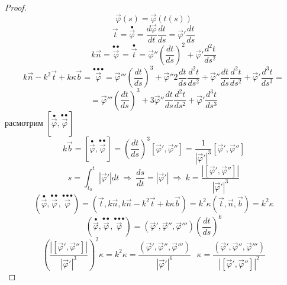 \begin{proof}
  $$
  \vec \varphi(s) = \vec \varphi(t(s))
  $$
  $$
  \vec t = \stackrel{\bullet}{\vec \varphi} = \frac{d \vec \varphi}{dt}
  \frac{dt}{ds} = \vec \varphi' \frac{dt}{ds}
  $$
  $$
  k \vec n = \stackrel{\bullet \bullet}{\vec \varphi} =
  \stackrel{\bullet}{\vec t} = \vec \varphi'' \left(\frac{dt}{ds}\right)^2 +
  \vec \varphi' \frac{d^2t}{ds^2}
  $$
  $$
  k \vec n - k^2 \vec t + k \kappa \vec b =
  \stackrel{\bullet \bullet \bullet}{\vec \varphi} = \vec \varphi'''
  \left(\frac{dt}{ds}\right)^3 + \vec \varphi'' 2 \frac{dt}{ds}
  \frac{d^2 t}{ds^2} +
  \vec \varphi'' \frac{dt}{ds} \frac{d^2 t}{ds^2} + \vec \varphi'
  \frac{d^3 t}{ds^3} =
  $$
  $$
  = \vec \varphi''' \left(\frac{dt}{ds}\right)^3 + 3 \vec \varphi''
  \frac{dt}{ds}\frac{d^2t}{ds^2} + \vec \varphi' \frac{d^3t}{ds^3}
  $$
  расмотрим $[\stackrel{\bullet}{\vec \varphi},
  \stackrel{\bullet \bullet}{\vec \varphi}]$
  $$
  k \vec b = [\stackrel{\bullet}{\vec \varphi},
  \stackrel{\bullet \bullet}{\vec \varphi}] = \left(\frac{dt}{ds}\right)^3
  [\vec \varphi', \vec \varphi''] = \frac{1}{|\vec \varphi'|^3}
  [\vec \varphi', \vec \varphi'']
  $$
  $$
  s = \int_{t_0}^t |\vec \varphi'|dt ~ \Rightarrow ~ \frac{ds}{dt} =
  |\vec \varphi'| ~ \Rightarrow ~
  k = \frac{|[\vec \varphi', \vec \varphi'']|}{|\vec \varphi'|^3}
  $$
  $$
  (\stackrel{\bullet}{\vec \varphi},
  \stackrel{\bullet \bullet}{\vec \varphi},
  \stackrel{\bullet \bullet \bullet}{\vec \varphi}) = (\vec t, k \vec n,
  k \vec n - k^2\vec t + k \kappa \vec b) = k^2 \kappa(\vec t, \vec n, \vec b) =
  k^2 \kappa
  $$
  $$
  (\stackrel{\bullet}{\vec \varphi},
  \stackrel{\bullet \bullet}{\vec \varphi},
  \stackrel{\bullet \bullet \bullet}{\vec \varphi}) =
  (\vec \varphi', \vec \varphi'', \vec \varphi''') \left(\frac{dt}{ds}\right)^6
  $$
  $$
  \left(\frac{|[\vec \varphi', \vec \varphi'']|}{|\vec \varphi'|^3}
  \right)^2 \kappa = k^2 \kappa =
  \frac{(\vec \varphi', \vec \varphi'', \vec \varphi''')}{|\vec \varphi'|^6}
  ~~~ \kappa =
  \frac{(\vec \varphi', \vec \varphi'', \vec \varphi''')}{|[\vec \varphi',
  \vec \varphi'']|^2}
  $$
\end{proof}

